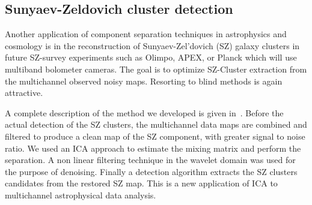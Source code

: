 \subsection{Sunyaev-Zeldovich cluster detection}

Another application of component separation techniques in astrophysics and cosmology is in the reconstruction of Sunyaev-Zel'dovich (SZ) 
galaxy clusters in future SZ-survey experiments such as Olimpo, APEX, or Planck which will use multiband bolometer cameras. The goal is 
to optimize SZ-Cluster extraction from the multichannel observed noisy maps. Resorting to blind methods is again attractive.

A complete description of the method we developed is given in~\cite{cluster:sz_cluster}. Before the actual detection of the SZ clusters, 
the multichannel data maps are combined and filtered to produce a clean map of the SZ component, with greater signal to noise ratio. We used 
an ICA approach to estimate the mixing matrix and perform the separation. A non linear filtering technique in the wavelet domain was used 
for the purpose of denoising. Finally a detection algorithm extracts the SZ clusters candidates from the restored SZ map. This is a new 
application of ICA to multichannel astrophysical data analysis. 

